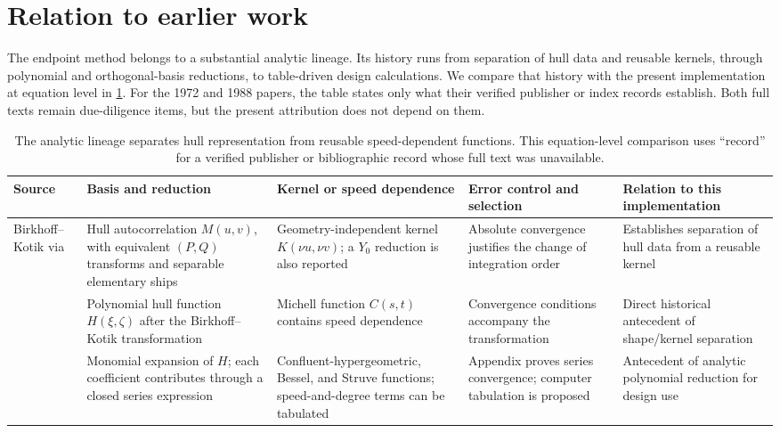 \documentclass[10pt]{article}
\begin{document}
\section{Relation to earlier work}
\label{sec:prior}

The endpoint method belongs to a substantial analytic lineage.  Its history
runs from separation of hull data and reusable kernels, through polynomial and
orthogonal-basis reductions, to table-driven design calculations.  We compare
that history with the present implementation at equation level in
\cref{tab:lineage}.  For the 1972 and 1988 papers, the table states only what
their verified publisher or index records establish.  Both full texts remain
due-diligence items, but the present attribution does not depend on them.

\begin{table}[t]
\centering
\caption{The analytic lineage separates hull representation from reusable
speed-dependent functions.  This equation-level comparison uses ``record''
for a verified publisher or bibliographic record whose full text was
unavailable.}
\label{tab:lineage}
\scriptsize
\begin{tabular}{@{}p{}p{}p{}p{}p{}@{}}
\toprule
Source & Basis and reduction & Kernel or speed dependence & Error control and selection & Relation to this implementation\\
\midrule
Birkhoff--Kotik via \citet[eqs.~39--45]{Wehausen1973}
& Hull autocorrelation \(M(u,v)\), with equivalent \((P,Q)\) transforms and separable elementary ships
& Geometry-independent kernel \(K(\nu u,\nu v)\); a \(Y_0\) reduction is also reported
& Absolute convergence justifies the change of integration order
& Establishes separation of hull data from a reusable kernel\\
\addlinespace
\citet[eqs.~3.3--3.4]{Michelsen1960}
& Polynomial hull function \(H(\xi,\zeta)\) after the Birkhoff--Kotik transformation
& Michell function \(C(s,t)\) contains speed dependence
& Convergence conditions accompany the transformation
& Direct historical antecedent of shape/kernel separation\\
\addlinespace
\citet[eqs.~3.21--3.22, 3.38--3.40]{Michelsen1960}
& Monomial expansion of \(H\); each coefficient contributes through a closed series expression
& Confluent-hypergeometric, Bessel, and Struve functions; speed-and-degree terms can be tabulated
& Appendix proves series convergence; computer tabulation is proposed
& Antecedent of analytic polynomial reduction for design use\\

\end{tabular}
\end{table}
\end{document}
